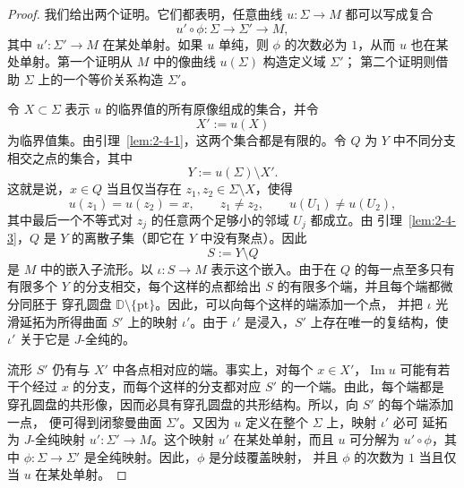 \begin{proof}
我们给出两个证明。它们都表明，任意曲线 $u:\Sigma\to M$ 都可以写成复合
\[
  u'\circ\phi:\Sigma\longrightarrow\Sigma'\longrightarrow M,
\]
其中 $u':\Sigma'\to M$ 在某处单射。如果 $u$ 单纯，则 $\phi$ 的次数必为 $1$，从而
$u$ 也在某处单射。第一个证明从 $M$ 中的像曲线 $u(\Sigma)$ 构造定义域 $\Sigma'$；
第二个证明则借助 $\Sigma$ 上的一个等价关系构造 $\Sigma'$。

令 $X\subset\Sigma$ 表示 $u$ 的临界值的所有原像组成的集合，并令
\[
  X':=u(X)
\]
为临界值集。由引理~\ref{lem:2-4-1}，这两个集合都是有限的。令 $Q$ 为 $Y$ 中不同分支
相交之点的集合，其中
\[
  Y:=u(\Sigma)\setminus X'.
\]
这就是说，$x\in Q$ 当且仅当存在 $z_1,z_2\in\Sigma\setminus X$，使得
\[
  u(z_1)=u(z_2)=x,
  \qquad
  z_1\ne z_2,
  \qquad
  u(U_1)\ne u(U_2),
\]
其中最后一个不等式对 $z_j$ 的任意两个足够小的邻域 $U_j$ 都成立。由
引理~\ref{lem:2-4-3}，$Q$ 是 $Y$ 的离散子集（即它在 $Y$ 中没有聚点）。因此
\[
  S:=Y\setminus Q
\]
是 $M$ 中的嵌入子流形。以 $\iota:S\to M$ 表示这个嵌入。由于在 $Q$ 的每一点至多只有
有限多个 $Y$ 的分支相交，每个这样的点都给出 $S$ 的有限多个端，并且每个端都微分同胚于
穿孔圆盘 $\mathbb D\setminus\{\mathrm{pt}\}$。因此，可以向每个这样的端添加一个点，
并把 $\iota$ 光滑延拓为所得曲面 $S'$ 上的映射 $\iota'$。由于 $\iota'$ 是浸入，$S'$
上存在唯一的复结构，使 $\iota'$ 关于它是 $J$-全纯的。

流形 $S'$ 仍有与 $X'$ 中各点相对应的端。事实上，对每个 $x\in X'$，$\operatorname{Im}u$
可能有若干个经过 $x$ 的分支，而每个这样的分支都对应 $S'$ 的一个端。由此，每个端都是
穿孔圆盘的共形像，因而必具有穿孔圆盘的共形结构。所以，向 $S'$ 的每个端添加一点，
便可得到闭黎曼曲面 $\Sigma'$。又因为 $u$ 定义在整个 $\Sigma$ 上，映射 $\iota'$ 必可
延拓为 $J$-全纯映射 $u':\Sigma'\to M$。这个映射 $u'$ 在某处单射，而且 $u$ 可分解为
$u'\circ\phi$，其中 $\phi:\Sigma\to\Sigma'$ 是全纯映射。因此，$\phi$ 是分歧覆盖映射，
并且 $\phi$ 的次数为 $1$ 当且仅当 $u$ 在某处单射。


\end{proof}

